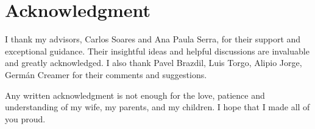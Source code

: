 \thispagestyle{empty}
\chapter*{Acknowledgment}
\vspace*{10mm}
I thank my advisors, Carlos Soares and Ana Paula Serra, for their support and exceptional guidance. Their insightful ideas and helpful discussions are invaluable and greatly acknowledged.  I also thank Pavel Brazdil, Luis Torgo, Alipio Jorge, Germán Creamer for their comments and suggestions.

Any written acknowledgment is not enough for the love, patience and understanding of my wife, my parents, and my children. I hope that I made all of you proud. 
\vspace*{15mm}